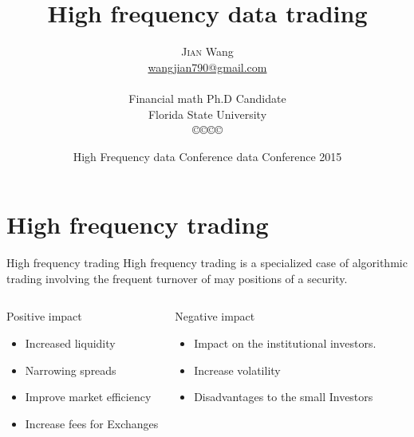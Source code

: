 \documentclass[xcolor={x11names,svgnames,dvipsnames}]{beamer}
\author[\textsc{Jian} Wang]{\textsc{Jian} Wang\\[1ex]%
{\small\url{wangjian790@gmail.com}\\[-.5ex]\url{}}\\
{\small{Financial math Ph.D Candidate}}\\
{\small{Florida State University}}\\
[0.8ex]\copyright\copyright\copyright\copyright} %
\title{High frequency data trading}
\date[\textsc{HFC} 2015]{High Frequency data Conference data Conference 2015 }%
\begin{document}
\begin{frame}
\maketitle
\end{frame}




\section{High frequency trading}
\begin{frame}


\begin{block}{High frequency trading}
High frequency trading is a specialized case of algorithmic trading involving the frequent turnover of may positions of a security.
\end{block}

\begin{columns}
\column{2.3in}
\begin{block}{Positive impact }
\begin{itemize}
\item Increased liquidity
\item Narrowing spreads
\item Improve market efficiency
\item Increase fees for Exchanges  
\end{itemize}
\end{block}

\column{2.3in}
\begin{block}{Negative impact }
\begin{itemize}
\item Impact on the institutional investors.
\item Increase volatility 
\item Disadvantages to the small Investors
\end{itemize}
\end{block}
\end{columns}

\end{frame}
\end{document}
